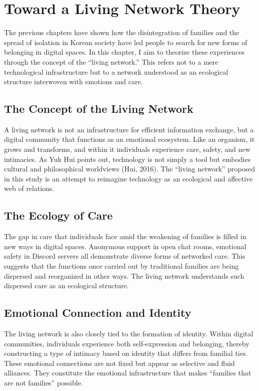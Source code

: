 \chapter{Toward a Living Network Theory}


The previous chapters have shown how the disintegration of families and the spread of isolation in Korean society have led people to search for new forms of belonging in digital spaces. In this chapter, I aim to theorize these experiences through the concept of the “living network.” This refers not to a mere technological infrastructure but to a network understood as an ecological structure interwoven with emotions and care.  

\section{The Concept of the Living Network}
A living network is not an infrastructure for efficient information exchange, but a digital community that functions as an emotional ecosystem. Like an organism, it grows and transforms, and within it individuals experience care, safety, and new intimacies. As Yuk Hui points out, technology is not simply a tool but embodies cultural and philosophical worldviews (Hui, 2016). The “living network” proposed in this study is an attempt to reimagine technology as an ecological and affective web of relations.  

\section{The Ecology of Care}
The gap in care that individuals face amid the weakening of families is filled in new ways in digital spaces. Anonymous support in open chat rooms, emotional safety in Discord servers all demonstrate diverse forms of networked care. This suggests that the functions once carried out by traditional families are being dispersed and reorganized in other ways. The living network understands such dispersed care as an ecological structure.  

\section{Emotional Connection and Identity}
The living network is also closely tied to the formation of identity. Within digital communities, individuals experience both self-expression and belonging, thereby constructing a type of intimacy based on identity that differs from familial ties. These emotional connections are not fixed but appear as selective and fluid alliances. They constitute the emotional infrastructure that makes “families that are not families” possible.  


